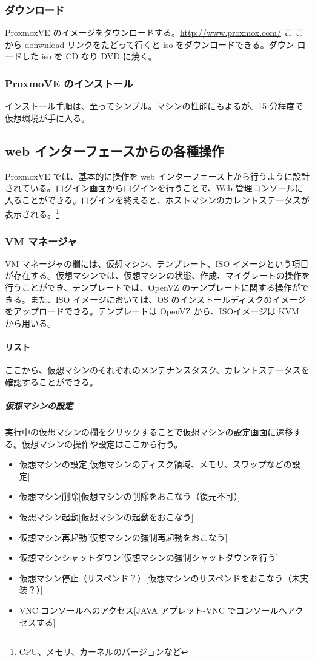 \documentclass[mingoth,a4paper]{jsarticle}
\begin{document}
\subsubsection{ダウンロード}
ProxmoxVE のイメージをダウンロードする。\url{http://www.proxmox.com/} こ
こから donwnload リンクをたどって行くと iso をダウンロードできる。ダウン
ロードした iso を CD なり DVD に焼く。

\subsubsection{ProxmoVE のインストール}
インストール手順は、至ってシンプル。マシンの性能にもよるが、15 分程度で仮想環境が手に入る。

\subsection{web インターフェースからの各種操作}
ProxmoxVE では、基本的に操作を web インターフェース上から行うように設計
されている。ログイン画面からログインを行うことで、Web 管理コンソールに入ることができる。ログインを終えると、ホストマシンのカレントステータスが表示される。\footnote{CPU、メモリ、カーネルのバージョンなど}

\subsubsection{VM マネージャ}
VM マネージャの欄には、仮想マシン、テンプレート、ISO イメージという項目
が存在する。仮想マシンでは、仮想マシンの状態、作成、マイグレートの操作を
行うことができ、テンプレートでは、OpenVZ のテンプレートに関する操作がで
きる。また、ISO イメージにおいては、OS のインストールディスクのイメージ
をアップロードできる。テンプレートは OpenVZ から、ISOイメージは KVM から用いる。

\paragraph{リスト}
ここから、仮想マシンのそれぞれのメンテナンスタスク、カレントステータスを確認することができる。

\subparagraph{仮想マシンの設定}
実行中の仮想マシンの欄をクリックすることで仮想マシンの設定画面に遷移する。仮想マシンの操作や設定はここから行う。

\begin{itemize}
 \item 仮想マシンの設定[仮想マシンのディスク領域、メモリ、スワップなどの設定]
 \item 仮想マシン削除[仮想マシンの削除をおこなう（復元不可）]
 \item 仮想マシン起動[仮想マシンの起動をおこなう]
 \item 仮想マシン再起動[仮想マシンの強制再起動をおこなう]
 \item 仮想マシンシャットダウン[仮想マシンの強制シャットダウンを行う]
 \item 仮想マシン停止（サスペンド？）[仮想マシンのサスペンドをおこなう（未実装？）]
 \item VNC コンソールへのアクセス[JAVA アプレット-VNC でコンソールへアクセスする]
\end{itemize}
\end{document}
